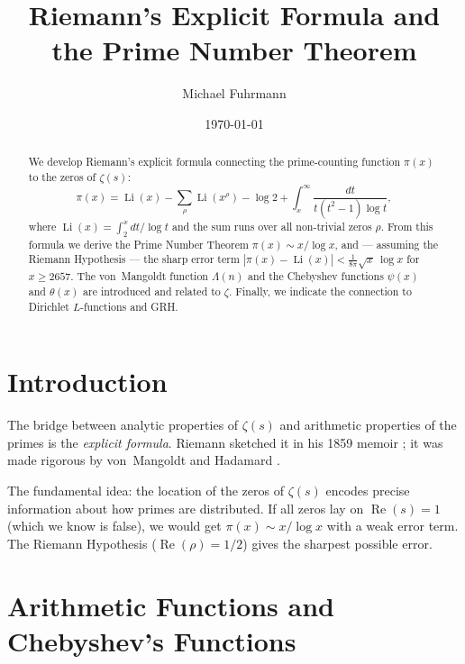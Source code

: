 \documentclass[12pt,a4paper]{amsart}
\theoremstyle{definition}
\DeclareMathOperator{\Re}{Re}
\DeclareMathOperator{\Li}{Li}
\begin{document}

\title{Riemann's Explicit Formula and the Prime Number Theorem}

\author{Michael Fuhrmann}
\address{Specialist Mathematics Project, Build 84}
\date{\today}

\begin{abstract}
We develop Riemann's explicit formula connecting the prime-counting function
$\pi(x)$ to the zeros of $\zeta(s)$:
\[
  \pi(x) = \Li(x) - \sum_\rho \Li(x^\rho) - \log 2
  + \int_x^{\infty} \frac{dt}{t(t^2-1)\log t},
\]
where $\Li(x) = \int_2^x dt/\log t$ and the sum runs over all non-trivial
zeros $\rho$.  From this formula we derive the Prime Number Theorem
$\pi(x) \sim x/\log x$, and --- assuming the Riemann Hypothesis ---
the sharp error term
$|\pi(x) - \Li(x)| < \tfrac{1}{8\pi}\sqrt{x}\,\log x$ for $x \ge 2657$.
The von~Mangoldt function $\Lambda(n)$ and the Chebyshev functions
$\psi(x)$ and $\theta(x)$ are introduced and related to $\zeta$.
Finally, we indicate the connection to Dirichlet $L$-functions and GRH.
\end{abstract}

\maketitle
\tableofcontents

\section{Introduction}

The bridge between analytic properties of $\zeta(s)$ and arithmetic
properties of the primes is the \emph{explicit formula}.  Riemann sketched
it in his 1859 memoir \cite{Riemann1859}; it was made rigorous by von~Mangoldt
\cite{vonMangoldt1895} and Hadamard \cite{Hadamard1896}.

The fundamental idea: the location of the zeros of $\zeta(s)$ encodes
precise information about how primes are distributed.  If all zeros lay
on $\Re(s) = 1$ (which we know is false), we would get $\pi(x) \sim x/\log x$
with a weak error term.  The Riemann Hypothesis ($\Re(\rho) = 1/2$)
gives the sharpest possible error.

\section{Arithmetic Functions and Chebyshev's Functions}
\end{document}
